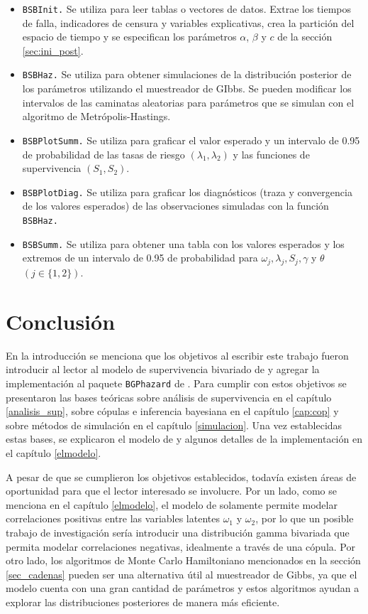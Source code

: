 \documentclass[11pt,a4paper]{article}
\begin{document}
\begin{itemize}
\item \texttt{BSBInit.} Se utiliza para leer tablas o vectores de datos. Extrae los tiempos de falla, indicadores de censura y variables explicativas, crea la partición del espacio de tiempo y se especifican los parámetros $\alpha$, $\beta$ y $c$ de la sección \ref{sec:ini_post}.
\item \texttt{BSBHaz.} Se utiliza para obtener simulaciones de la distribución posterior de los parámetros utilizando el muestreador de GIbbs. Se pueden modificar los intervalos de las caminatas aleatorias para parámetros que se simulan con el algoritmo de Metrópolis-Hastings.
\item \texttt{BSBPlotSumm.} Se utiliza para graficar el valor esperado y un intervalo de 0.95 de probabilidad de las tasas de riesgo $(\lambda_1, \lambda_2)$ y las funciones de supervivencia $(S_1, S_2)$.
\item \texttt{BSBPlotDiag.} Se utiliza para graficar los diagnósticos (traza y convergencia de los valores esperados) de las observaciones simuladas con la función \texttt{BSBHaz.} 
\item \texttt{BSBSumm.} Se utiliza para obtener una tabla con los valores esperados y los extremos de un intervalo de 0.95 de probabilidad para $\omega_j, \lambda_j, S_j, \gamma$ y $\theta$ $(j\in \lbrace 1, 2 \rbrace)$.
\end{itemize}

\clearpage
\newpage

\section{Conclusión}

En la introducción se menciona que los objetivos al escribir este trabajo fueron introducir al lector al modelo de supervivencia bivariado de \citet{nieto} y agregar la implementación al paquete \texttt{BGPhazard} de \citet{bgphazard}. Para cumplir con estos objetivos se presentaron las bases teóricas sobre análisis de supervivencia en el capítulo \ref{analisis_sup}, sobre cópulas e inferencia bayesiana en el capítulo \ref{cap:cop} y sobre métodos de simulación en el capítulo \ref{simulacion}. Una vez establecidas estas bases, se explicaron el modelo de \citet{nieto} y algunos detalles de la implementación en el capítulo \ref{elmodelo}.

A pesar de que se cumplieron los objetivos establecidos, todavía existen áreas de oportunidad para que el lector interesado se involucre. Por un lado, como se menciona en el capítulo \ref{elmodelo}, el modelo de \citet{nieto} solamente permite modelar correlaciones positivas entre las variables latentes $\omega_1$ y $\omega_2$, por lo que un posible trabajo de investigación sería introducir una distribución gamma bivariada que permita modelar correlaciones negativas, idealmente a través de una cópula.  Por otro lado, los algoritmos de Monte Carlo Hamiltoniano mencionados en la sección \ref{sec_cadenas} pueden ser una alternativa útil al muestreador de Gibbs, ya que el modelo cuenta con una gran cantidad de parámetros y estos algoritmos ayudan a explorar las distribuciones posteriores de manera más eficiente.
\end{document}
